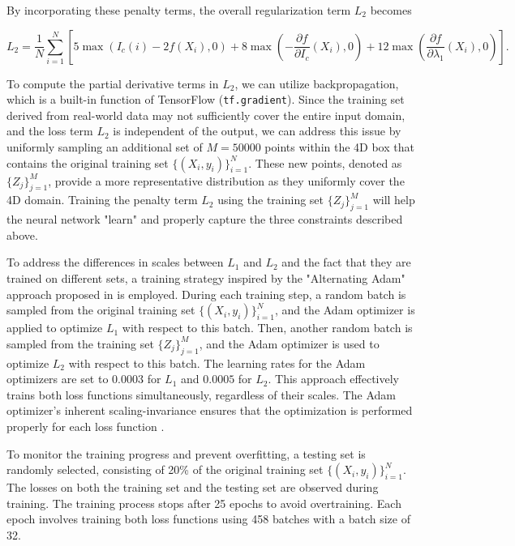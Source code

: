 \documentclass[sn-mathphys,Numbered]{sn-jnl}
\begin{document}
By incorporating these penalty terms, the overall regularization term $L_2$ becomes

$$L_2=\frac{1}{N}\sum_{i=1}^{N}\left[5 \max{\left(I_c(i) -2 f(X_i),0\right)}+ 8 \max{\left(-\frac{\partial f}{\partial I_c}(X_i),0\right)} + 12 \max {\left ( \frac{\partial f}{\partial \lambda_1}(X_i), 0\right )}\right].$$


To compute the partial derivative terms in $L_2$, we can utilize backpropagation, which is a built-in function of TensorFlow (\texttt{tf.gradient}). Since the training set derived from real-world data may not sufficiently cover the entire input domain, and the loss term $L_2$ is independent of the output, we can address this issue by uniformly sampling an additional set of $M = 50000$ points within the 4D box that contains the original training set $\{(X_i, y_i)\}_{i=1}^N$. These new points, denoted as $\{Z_j\}_{j = 1}^M$, provide a more representative distribution as they uniformly cover the 4D domain. Training the penalty term $L_2$ using the training set $\{Z_j\}_{j=1}^M$ will help the neural network "learn" and properly capture the three constraints described above.

To address the differences in scales between $L_1$ and $L_2$ and the fact that they are trained on different sets, a training strategy inspired by the "Alternating Adam" approach proposed in \cite{zhai2022deep} is employed. During each training step, a random batch is sampled from the original training set $\{(X_i, y_i)\}_{i=1}^N$, and the Adam optimizer is applied to optimize $L_1$ with respect to this batch. Then, another random batch is sampled from the training set $\{Z_j\}_{j=1}^M$, and the Adam optimizer is used to optimize $L_2$ with respect to this batch. The learning rates for the Adam optimizers are set to $0.0003$ for $L_1$ and $0.0005$ for $L_2$. This approach effectively trains both loss functions simultaneously, regardless of their scales. The Adam optimizer's inherent scaling-invariance ensures that the optimization is performed properly for each loss function \cite{kingma2014adam}.

To monitor the training progress and prevent overfitting, a testing set is randomly selected, consisting of 20\% of the original training set $\{(X_i, y_i)\}_{i=1}^N$. The losses on both the training set and the testing set are observed during training. The training process stops after 25 epochs to avoid overtraining. Each epoch involves training both loss functions using 458 batches with a batch size of 32.
\end{document}
